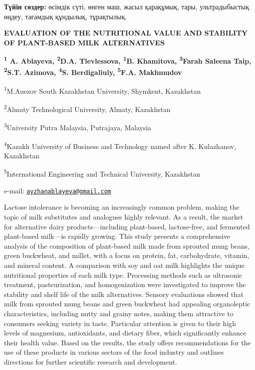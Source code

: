 {\bfseries Түйін сөздер:} өсімдік сүті, өнген маш, жасыл қарақұмық, тары,
ультрадыбыстық өңдеу, тағамдық құндылық, тұрақтылық.

\begin{articleheader}
{\bfseries EVALUATION OF THE NUTRITIONAL VALUE AND STABILITY OF PLANT-BASED
MILK ALTERNATIVES}

{\bfseries
\textsuperscript{1} A. Ablayeva\textsuperscript{\envelope },
\textsuperscript{2}D.A. Tlevlessova,
\textsuperscript{1}B. Khamitova,
\textsuperscript{3}Farah Saleena Taip,
\textsuperscript{2}S.T. Azimova,
\textsuperscript{4}S. Berdigaliuly,
\textsuperscript{5}F.A. Makhmudov
}
\end{articleheader}

\begin{affiliation}
\textsuperscript{1}M.Auezov South Kazakhstan University, Shymkent,
Kazakhstan

\textsuperscript{2}Almaty Technological University, Almaty, Kazakhstan

\textsuperscript{3}University Putra Malaysia, Putrajaya, Malaysia

\textsuperscript{4}Kazakh University of Business and Technology named
after K. Kulazhanov, Kazakhstan

\textsuperscript{5}International Engineering and Technical University,
Kazakhstan

e-mail: \href{mailto:ayzhanablayeva@gmail.com}{\nolinkurl{ayzhanablayeva@gmail.com}}
\end{affiliation}

Lactose intolerance is becoming an increasingly common problem, making
the topic of milk substitutes and analogues highly relevant. As a
result, the market for alternative dairy products---including
plant-based, lactose-free, and fermented plant-based milk---is rapidly
growing. This study presents a comprehensive analysis of the composition
of plant-based milk made from sprouted mung beans, green buckwheat, and
millet, with a focus on protein, fat, carbohydrate, vitamin, and mineral
content. A comparison with soy and oat milk highlights the unique
nutritional properties of each milk type. Processing methods such as
ultrasonic treatment, pasteurization, and homogenization were
investigated to improve the stability and shelf life of the milk
alternatives. Sensory evaluations showed that milk from sprouted mung
beans and green buckwheat had appealing organoleptic characteristics,
including nutty and grainy notes, making them attractive to consumers
seeking variety in taste. Particular attention is given to their high
levels of magnesium, antioxidants, and dietary fiber, which
significantly enhance their health value. Based on the results, the
study offers recommendations for the use of these products in various
sectors of the food industry and outlines directions for further
scientific research and development.

